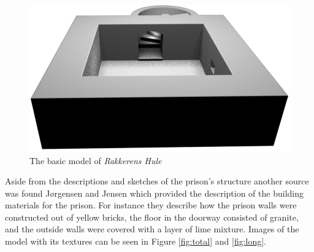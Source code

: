 \begin{figure}[h!]
   \centering
   \includegraphics[scale=0.7]{figures/model.png}
   \caption{The basic model of \textit{Rakkerens Hule}}\label{fig:model}
\end{figure}

Aside from the descriptions and sketches of the prison’s structure another source was found Jørgensen \cite{Jorgensen1934} and Jensen \cite{Jensen1909} which provided the description of the building materials for the prison. For instance they describe how the prison walls were constructed out of yellow bricks, the floor in the doorway consisted of granite, and the outside walls were covered with a layer of lime mixture. Images of the model with its textures can be seen in Figure \ref{fig:total} and \ref{fig:long}. 